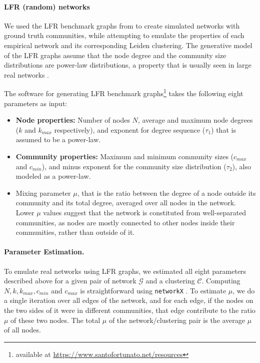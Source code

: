 \documentclass[11pt]{article}   	%
\begin{document}
\paragraph{LFR (random) networks} 

We used the LFR benchmark graphs from \cite{lancichinetti2008benchmark} to create simulated networks with ground truth communities, while attempting to emulate the properties of each empirical network and its corresponding Leiden clustering. The generative model of the LFR graphs assume that the node degree and the community size distributions are power-law distributions, a property that is usually seen in large real networks \citep{albert2002statistical}. 

The software for generating LFR benchmark graphs\footnote{available at \href{https://www.santofortunato.net/resources}{https://www.santofortunato.net/resources}} takes the following eight parameters as input:
\begin{itemize}
    \item  \textbf{Node properties:} Number of nodes $N$, average and maximum node degrees ($k$ and $k_{max}$ respectively), and exponent for degree sequence ($\tau_1$) that is assumed to be a power-law.
    \item \textbf{Community properties:} Maximum and minimum community sizes ($c_{max}$ and $c_{min}$), and minus exponent for the community size distribution ($\tau_2$), also modeled as a power-law.
    \item Mixing parameter $\mu$, that is the ratio between the degree of a node outside its community and its total degree, averaged over all nodes in the network. Lower $\mu$ values suggest that the network is constituted from well-separated communities, as nodes are mostly connected to other nodes inside their communities, rather than outside of it.
\end{itemize}






\paragraph{Parameter Estimation.} To emulate real networks using LFR graphs, we estimated all eight parameters described above for a given pair of network $\mathcal{G}$ and a clustering $\mathcal{C}$. Computing $N, k, k_{max}, c_{min}$ and $c_{max}$ is straightforward using \texttt{networkX} \citep{hagberg2008exploring}. To estimate $\mu$, we do a single iteration over all edges of the network, and for each edge, if the nodes on the two sides of it were in different communities, that edge contribute to the ratio $\mu$ of these two nodes. The total $\mu$ of the network/clustering pair is the average $\mu$ of all nodes.
\end{document}
